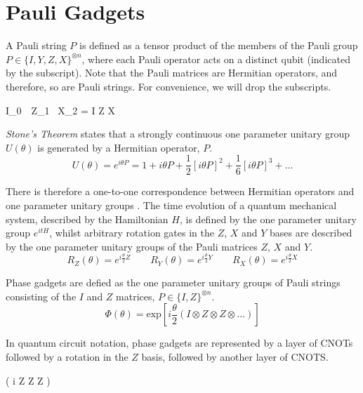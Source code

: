 \chapter{\label{pauli-gadgets}Pauli Gadgets}

A Pauli string $P$ is defined as a tensor product of the members of the Pauli group $P \in \{I, Y, Z, X\}^{\otimes n}$, where each Pauli operator acts on a distinct qubit (indicated by the subscript). Note that the Pauli matrices are Hermitian operators, and therefore, so are Pauli strings. For convenience, we will drop the subscripts.

{I_0 \,\, Z_1 \, X_2 = I \otimes Z \otimes X}

\textit{Stone's Theorem} \cite{Stone1932} states that a strongly continuous one parameter unitary group $U(\theta)$ is generated by a Hermitian operator, $P$.
\begin{equation*}
    U(\theta) = e^{i\theta P} = 1 + i\theta P +
    \frac{1}{2} [i\theta P]^2 +
    \frac{1}{6} [i\theta P]^3 + \dots
\end{equation*}

There is therefore a one-to-one correspondence between Hermitian operators and one parameter unitary groups \cite{Yeung2020}. The time evolution of a quantum mechanical system, described by the Hamiltonian $H$, is defined by the one parameter unitary group $e^{itH}$, whilst arbitrary rotation gates in the $Z$, $X$ and $Y$ bases are described by the one parameter unitary groups of the Pauli matrices $Z$, $X$ and $Y$.
\begin{equation*}
    R_Z(\theta) = e^{i\frac{\theta}{2} Z} \qquad
    R_Y(\theta) = e^{i\frac{\theta}{2} Y} \qquad
    R_X(\theta) = e^{i\frac{\theta}{2} X}
\end{equation*}

Phase gadgets are defied as the one parameter unitary groups of Pauli strings consisting of the $I$ and $Z$ matrices, $P \in \{I, Z\}^{\otimes n}$.
\begin{equation*}
    \Phi(\theta) = \text{exp} \left[
    i\frac{\theta}{2} (I \otimes Z \otimes Z \otimes \dots)
    \right]
\end{equation*}

In quantum circuit notation, phase gadgets are represented by a layer of CNOTs followed by a rotation in the $Z$ basis, followed by another layer of CNOTS.

{ \left( i  Z \otimes Z \otimes Z \right)}

